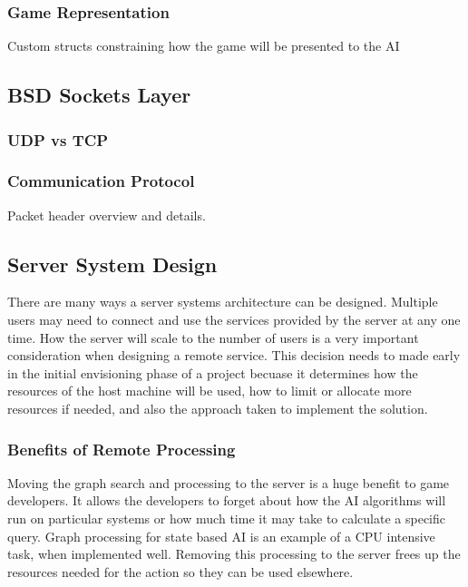 \documentclass[12pt,a4paper,titlepage]{article}
\begin{document}
\subsubsection{Game Representation}

Custom structs constraining how the game will be presented to the AI


\subsection{BSD Sockets Layer}
\label{section:networklayer}

\subsubsection{UDP vs TCP}

\subsubsection{Communication Protocol}

Packet header overview and details.\\

\subsection{Server System Design}
\label{section:serverdesign}

There are many ways a server systems architecture can be designed. Multiple users may need to connect and use the services provided by the server at any one time. How the server will scale to the number of users is a very important consideration when designing a remote service. This decision needs to made early in the initial envisioning phase of a project becuase it determines how the resources of the host machine will be used, how to limit or allocate more resources if needed, and also the approach taken to implement the solution.\\

\subsubsection{Benefits of Remote Processing}

Moving the graph search and processing to the server is a huge benefit to game developers. It allows the developers to forget about how the AI algorithms will run on particular systems or how much time it may take to calculate a specific query. Graph processing for state based AI is an example of a CPU intensive task, when implemented well. Removing this processing to the server frees up the resources needed for the action so they can be used elsewhere.\\
\end{document}
